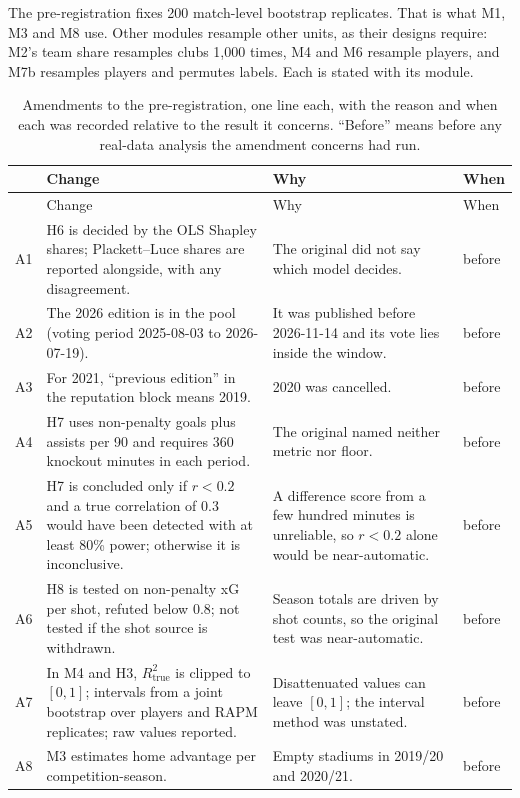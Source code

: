 \documentclass[11pt,a4paper]{article}
\begin{document}
The pre-registration fixes 200 match-level bootstrap replicates. That is what
M1, M3 and M8 use. Other modules resample other units, as their designs
require: M2's team share resamples clubs 1,000 times, M4 and M6 resample
players, and M7b resamples players and permutes labels. Each is stated with
its module.

{\small
\setlength{\tabcolsep}{4pt}
\begin{longtable}{@{}L{0.7cm}L{6.9cm}L{4.6cm}L{2.1cm}@{}}
\caption{Amendments to the pre-registration, one line each, with the reason and
when each was recorded relative to the result it concerns. ``Before'' means
before any real-data analysis the amendment concerns had run.}
\label{tab:amendments}\\
\toprule
& Change & Why & When \\
\midrule
\endfirsthead
\toprule
& Change & Why & When \\
\midrule
\endhead
\bottomrule
\endlastfoot
A1 & H6 is decided by the OLS Shapley shares; Plackett--Luce shares are reported alongside, with any disagreement. & The original did not say which model decides. & before \\
A2 & The 2026 edition is in the pool (voting period 2025-08-03 to 2026-07-19). & It was published before 2026-11-14 and its vote lies inside the window. & before \\
A3 & For 2021, ``previous edition'' in the reputation block means 2019. & 2020 was cancelled. & before \\
A4 & H7 uses non-penalty goals plus assists per 90 and requires 360 knockout minutes in each period. & The original named neither metric nor floor. & before \\
A5 & H7 is concluded only if $r < 0.2$ and a true correlation of 0.3 would have been detected with at least 80\% power; otherwise it is inconclusive. & A difference score from a few hundred minutes is unreliable, so $r < 0.2$ alone would be near-automatic. & before \\
A6 & H8 is tested on non-penalty xG per shot, refuted below 0.8; not tested if the shot source is withdrawn. & Season totals are driven by shot counts, so the original test was near-automatic. & before \\
A7 & In M4 and H3, $R^2_{\text{true}}$ is clipped to $[0,1]$; intervals from a joint bootstrap over players and RAPM replicates; raw values reported. & Disattenuated values can leave $[0,1]$; the interval method was unstated. & before \\
A8 & M3 estimates home advantage per competition-season. & Empty stadiums in 2019/20 and 2020/21. & before \\

\end{longtable}}
\end{document}
